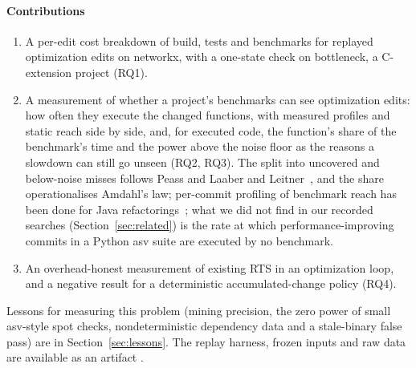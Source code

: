\paragraph*{Contributions}
\begin{enumerate}
\item A per-edit cost breakdown of build, tests and benchmarks for replayed optimization edits on networkx, with a one-state check on bottleneck, a C-extension project (RQ1).
\item A measurement of whether a project's benchmarks can see optimization edits: how often they execute the changed functions, with measured profiles and static reach side by side, and, for executed code, the function's share of the benchmark's time and the power above the noise floor as the reasons a slowdown can still go unseen (RQ2, RQ3). The split into uncovered and below-noise misses follows Peass and Laaber and Leitner~\cite{reichelt2023peass,laaber2018evaluation}, and the share operationalises Amdahl's law; per-commit profiling of benchmark reach has been done for Java refactorings~\cite{traini2021refactoring}; what we did not find in our recorded searches (Section~\ref{sec:related}) is the rate at which performance-improving commits in a Python asv suite are executed by no benchmark.
\item An overhead-honest measurement of existing RTS in an optimization loop, and a negative result for a deterministic accumulated-change policy (RQ4).
\end{enumerate}
Lessons for measuring this problem (mining precision, the zero power of small asv-style spot checks, nondeterministic dependency data and a stale-binary false pass) are in Section~\ref{sec:lessons}.
The replay harness, frozen inputs and raw data are available as an artifact .
